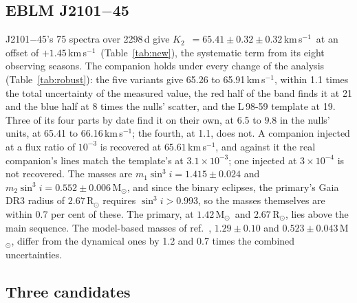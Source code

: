 \documentclass[3p,11pt]{elsarticle}
\newcommand{\kms}{km\,s$^{-1}$}
\newcommand{\Msun}{M$_\odot$}
\newcommand{\Ktwo}{$K_2$}
\begin{document}
\subsection{EBLM J2101$-$45}

J2101$-$45's 75 spectra over 2298\,d give \Ktwo\ $= 65.41 \pm 0.32 \pm 0.32$\,\kms\ at an offset of
$+1.45$\,\kms\ (Table~\ref{tab:new}), the systematic term from its eight observing seasons. The
companion holds under every change of the analysis (Table~\ref{tab:robust}): the five variants
give 65.26 to 65.91\,\kms, within 1.1 times the total uncertainty of the measured value, the red
half of the band finds it at 21 and the blue half at 8 times the nulls' scatter, and the L\,98-59
template at 19. Three of its four parts by date find it on their own, at 6.5 to $9.8$ in the
nulls' units, at 65.41 to 66.16\,\kms; the fourth, at 1.1, does not. A companion injected at a flux
ratio of $10^{-3}$ is recovered at $65.61$\,\kms, and against it the real companion's lines match
the template's at $3.1\times10^{-3}$; one injected at $3\times10^{-4}$ is not recovered. The masses
are $m_1\sin^3 i = 1.415 \pm 0.024$ and $m_2\sin^3 i = 0.552 \pm 0.006$\,\Msun, and since the
binary eclipses, the primary's Gaia DR3 radius of $2.67$\,R$_\odot$ requires $\sin^3 i > 0.993$, so
the masses themselves are within 0.7 per cent of these. The primary, at $1.42$\,\Msun\ and
$2.67$\,R$_\odot$, lies above the main sequence. The model-based masses of
ref.~\cite{Triaud2017}, $1.29 \pm 0.10$ and $0.523 \pm 0.043$\,\Msun, differ from the dynamical
ones by 1.2 and 0.7 times the combined uncertainties.

\subsection{Three candidates}
\end{document}
